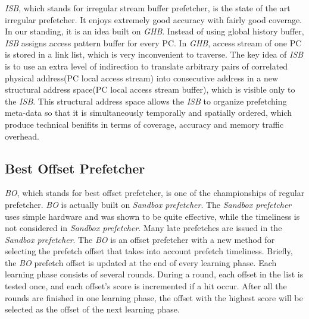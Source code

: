   \emph{ISB}, which stands for irregular stream buffer prefetcher, is the state of the art irregular prefetcher. It enjoys extremely good accuracy with fairly good coverage. In our standing, it is an idea built on \emph{GHB}\cite{ghbpaper}. Instead of using global history buffer, \emph{ISB} assigns access pattern buffer for every PC. In \emph{GHB}, access stream of one PC is stored in a link list, which is very inconvenient to traverse. The key idea of \emph{ISB} is to use an extra level of indirection to translate arbitrary pairs of correlated physical address(PC local access stream) into consecutive address in a new structural address space(PC local access stream buffer), which is visible only to the \emph{ISB}. This structural address space allows the \emph{ISB} to organize prefetching meta-data so that it is simultaneously temporally and spatially ordered, which produce technical benifits in terms of coverage, accuracy and memory traffic overhead.

  \subsection{Best Offset Prefetcher}
  \label{sec:bointro}

  \emph{BO}, which stands for best offset prefetcher, is one of the championships of regular prefetcher. \emph{BO} is actually built on \emph{Sandbox prefetcher}\cite{sandboxpaper}. The \emph{Sandbox prefetcher} uses simple hardware and was shown to be quite effective, while the timeliness is not considered in \emph{Sandbox prefetcher}. Many late prefetches are issued in the \emph{Sandbox prefetcher}. The \emph{BO} is an offset prefetcher with a new method for selecting the prefetch offset that takes into account prefetch timeliness. Briefly, the \emph{BO} prefetch offset is updated at the end of every learning phase. Each learning phase consists of several rounds. During a round, each offset in the list is tested once, and each offset's score is incremented if a hit occur. After all the rounds are finished in one learning phase, the offset with the highest score will be selected as the offset of the next learning phase.

